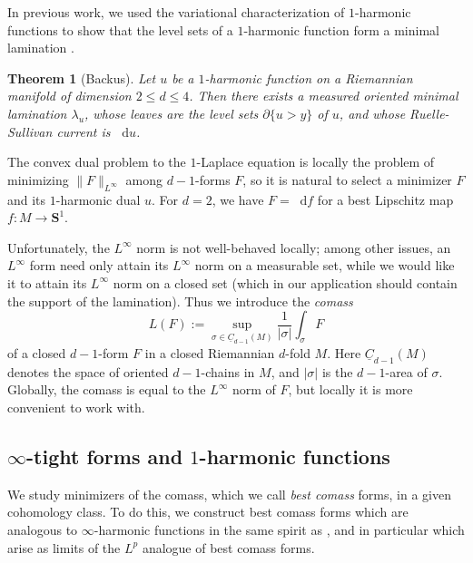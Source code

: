\documentclass[reqno,11pt]{amsart}
\newcommand{\Sph}{\mathbf S}
\newcommand*\dif{\mathop{}\!\mathrm{d}}
\newcommand{\Chain}{\underline C}
\newcommand{\dfn}[1]{\emph{#1}\index{#1}}
\newtheorem{theorem}{Theorem}[section]
\theoremstyle{definition}
\numberwithin{equation}{section}
\begin{document}
In previous work, we used the variational characterization of $1$-harmonic functions to show that the level sets of a $1$-harmonic function form a minimal lamination \cite[Theorem D]{BackusCML}.

\begin{theorem}[Backus]\label{CML}
Let $u$ be a $1$-harmonic function on a Riemannian manifold of dimension $2 \leq d \leq 4$.
Then there exists a measured oriented minimal lamination $\lambda_u$, whose leaves are the level sets $\partial \{u > y\}$ of $u$, and whose Ruelle-Sullivan current is $\dif u$.
\end{theorem}

The convex dual problem to the $1$-Laplace equation is locally the problem of minimizing $\|F\|_{L^\infty}$ among $d-1$-forms $F$, so it is natural to select a minimizer $F$ and its $1$-harmonic dual $u$.
For $d = 2$, we have $F = \dif f$ for a best Lipschitz map $f: M \to \Sph^1$.

Unfortunately, the $L^\infty$ norm is not well-behaved locally; among other issues, an $L^\infty$ form need only attain its $L^\infty$ norm on a measurable set, while we would like it to attain its $L^\infty$ norm on a closed set (which in our application should contain the support of the lamination).
Thus we introduce the \dfn{comass}
\begin{equation}\label{comass}
L(F) := \sup_{\sigma \in \Chain_{d - 1}(M)} \frac{1}{|\sigma|} \int_\sigma F
\end{equation}
of a closed $d-1$-form $F$ in a closed Riemannian $d$-fold $M$.
Here $\Chain_{d - 1}(M)$ denotes the space of oriented $d - 1$-chains in $M$, and $|\sigma|$ is the $d-1$-area of $\sigma$.
Globally, the comass is equal to the $L^\infty$ norm of $F$, but locally it is more convenient to work with.


\subsection{\texorpdfstring{$\infty$-tight forms and $1$-harmonic functions}{Infinity-tight forms and one-harmonic functions}}
We study minimizers of the comass, which we call \dfn{best comass} forms, in a given cohomology class.
To do this, we construct best comass forms which are analogous to $\infty$-harmonic functions in the same spirit as \cite{daskalopoulos2020transverse,daskalopoulos2022}, and in particular which arise as limits of the $L^p$ analogue of best comass forms.
\end{document}
